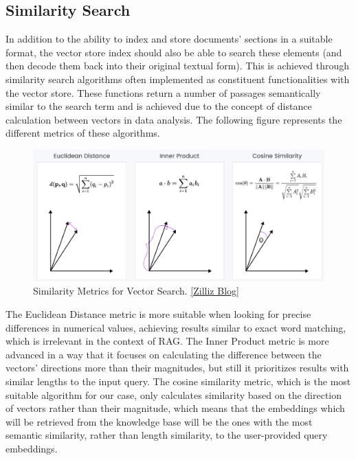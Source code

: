 \subsection{Similarity Search}
In addition to the ability to index and store documents' sections in a suitable format, the vector store index should also be able to search these elements (and then decode them back into their original textual form). This is achieved through similarity search algorithms often implemented as constituent functionalities with the vector store. These functions return a number of passages semantically similar to the search term and is achieved due to the concept of distance calculation between vectors in data analysis.\newline
The following figure represents the different metrics of these algorithms.
\begin{figure}[H]
    \centering
    \includegraphics[width=\linewidth]{./figures/vector-distance-metrics.png}
    \caption{Similarity Metrics for Vector Search. \href{https://zilliz.com/blog/similarity-metrics-for-vector-search}{[Zilliz Blog]}}
\end{figure}
The Euclidean Distance metric is more suitable when looking for precise differences in numerical values, achieving results similar to exact word matching, which is irrelevant in the context of RAG. The Inner Product metric is more advanced in a way that it focuses on calculating the difference between the vectors' directions more than their magnitudes, but still it prioritizes results with similar lengths to the input query. The cosine similarity metric, which is the most suitable algorithm for our case, only calculates similarity based on the direction of vectors rather than their magnitude, which means that the embeddings which will be retrieved from the knowledge base will be the ones with the most semantic similarity, rather than length similarity, to the user-provided query embeddings.
